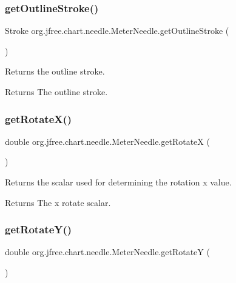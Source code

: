 \subsubsection{\texorpdfstring{get\+Outline\+Stroke()}{getOutlineStroke()}}
{\footnotesize\ttfamily Stroke org.\+jfree.\+chart.\+needle.\+Meter\+Needle.\+get\+Outline\+Stroke (\begin{DoxyParamCaption}{ }\end{DoxyParamCaption})}

Returns the outline stroke.

\begin{DoxyReturn}{Returns}
The outline stroke. 
\end{DoxyReturn}
\mbox{\label{classorg_1_1jfree_1_1chart_1_1needle_1_1_meter_needle_ae0007e8d62f5c24c9b53183966a3241a}} 
\subsubsection{\texorpdfstring{get\+Rotate\+X()}{getRotateX()}}
{\footnotesize\ttfamily double org.\+jfree.\+chart.\+needle.\+Meter\+Needle.\+get\+RotateX (\begin{DoxyParamCaption}{ }\end{DoxyParamCaption})}

Returns the scalar used for determining the rotation x value.

\begin{DoxyReturn}{Returns}
The x rotate scalar. 
\end{DoxyReturn}
\mbox{\label{classorg_1_1jfree_1_1chart_1_1needle_1_1_meter_needle_addc715db36b291ef22ecd700e76b7df5}} 
\subsubsection{\texorpdfstring{get\+Rotate\+Y()}{getRotateY()}}
{\footnotesize\ttfamily double org.\+jfree.\+chart.\+needle.\+Meter\+Needle.\+get\+RotateY (\begin{DoxyParamCaption}{ }\end{DoxyParamCaption})}

